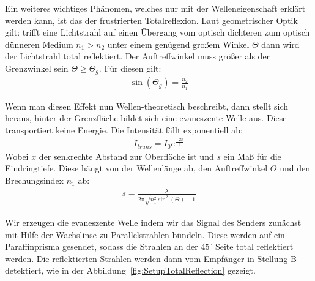 \documentclass[a4paper,10pt,twocolumn]{article}
\begin{document}
    
    Ein weiteres wichtiges Phänomen, welches nur mit der Welleneigenschaft erklärt werden kann, ist das
    der frustrierten Totalreflexion.
    Laut geometrischer Optik gilt: trifft eine Lichtstrahl auf einen Übergang vom optisch dichteren zum optisch dünneren Medium 
    $n_1 > n_2$ unter einem genügend großem Winkel $\Theta$ dann wird der Lichtstrahl total reflektiert.
    Der Auftreffwinkel muss größer als der Grenzwinkel sein $\Theta \geq \Theta_g$.
    Für diesen gilt:
    \begin{align*}
        \sin(\Theta_g) = \frac{n_2}{n_1}
    \end{align*}
    
    Wenn man diesen Effekt nun Wellen-theoretisch beschreibt, dann stellt sich heraus, hinter der Grenzfläche
    bildet sich eine evaneszente Welle aus.
    Diese transportiert keine Energie.
    Die Intensität fällt exponentiell ab:
    \begin{align}
        \label{eq:ExpTransDecline}
        I_{trans} = I_0 e^{\frac{-2x}{s}} 
    \end{align}
    Wobei $x$ der senkrechte Abstand zur Oberfläche ist und $s$ ein Maß für die Eindringtiefe.
    Diese hängt von der Wellenlänge ab, den Auftreffwinkel $\Theta$ und den Brechungsindex $n_1$ ab:
    \begin{align}
        s = \frac{\lambda}{2 \pi \sqrt {n_1^2 \sin^2(\Theta) - 1}}
    \end{align}
    
    Wir erzeugen die evaneszente Welle indem wir das Signal des Senders zunächst mit Hilfe der
    Wachslinse zu Parallelstrahlen bündeln.
    Diese werden auf ein Paraffinprisma gesendet, sodass die Strahlen an der $45^{\circ}$ Seite
    total reflektiert werden.
    Die reflektierten Strahlen werden dann vom Empfänger in Stellung B detektiert, wie in der
    Abbildung~\ref{fig:SetupTotalReflection} gezeigt.
    
\end{document}
